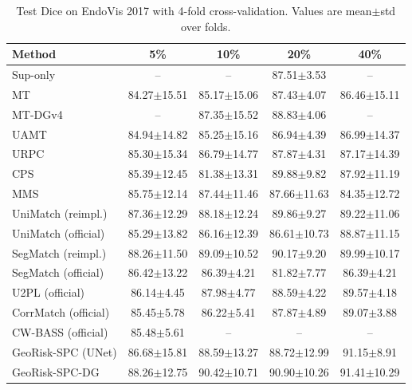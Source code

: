 \documentclass[journal]{IEEEtran}
\begin{document}
\begin{table}[t]
\caption{Test Dice on EndoVis 2017 with 4-fold cross-validation. Values are mean$\pm$std over folds.}
\label{tab:main_results}
\centering
\scriptsize
\begin{tabular}{lcccc}
\toprule
Method & 5\% & 10\% & 20\% & 40\% \\
\midrule
Sup-only & -- & -- & 87.51{\tiny$\pm$3.53} & -- \\
MT \cite{tarvainen2017mean} & 84.27{\tiny$\pm$15.51} & 85.17{\tiny$\pm$15.06} & 87.43{\tiny$\pm$4.07} & 86.46{\tiny$\pm$15.11} \\
MT-DGv4 & -- & 87.35{\tiny$\pm$15.52} & 88.83{\tiny$\pm$4.06} & -- \\
UAMT \cite{yu2019uncertainty} & 84.94{\tiny$\pm$14.82} & 85.25{\tiny$\pm$15.16} & 86.94{\tiny$\pm$4.39} & 86.99{\tiny$\pm$14.37} \\
URPC \cite{chen2021urpc} & 85.30{\tiny$\pm$15.34} & 86.79{\tiny$\pm$14.77} & 87.87{\tiny$\pm$4.31} & 87.17{\tiny$\pm$14.39} \\
CPS \cite{chen2021cps} & 85.39{\tiny$\pm$12.45} & 81.38{\tiny$\pm$13.31} & 89.88{\tiny$\pm$9.82} & 87.92{\tiny$\pm$11.19} \\
MMS \cite{li2023minmax} & 85.75{\tiny$\pm$12.14} & 87.44{\tiny$\pm$11.46} & 87.66{\tiny$\pm$11.63} & 84.35{\tiny$\pm$12.72} \\
UniMatch (reimpl.) \cite{yang2023unimatch} & 87.36{\tiny$\pm$12.29} & 88.18{\tiny$\pm$12.24} & 89.86{\tiny$\pm$9.27} & 89.22{\tiny$\pm$11.06} \\
UniMatch (official) \cite{yang2023unimatch} & 85.29{\tiny$\pm$13.82} & 86.16{\tiny$\pm$12.39} & 86.61{\tiny$\pm$10.73} & 88.87{\tiny$\pm$11.15} \\
SegMatch (reimpl.) \cite{segmatch2025} & 88.26{\tiny$\pm$11.50} & 89.09{\tiny$\pm$10.52} & 90.17{\tiny$\pm$9.20} & 89.99{\tiny$\pm$10.17} \\
SegMatch (official) \cite{segmatch2025} & 86.42{\tiny$\pm$13.22} & 86.39{\tiny$\pm$4.21} & 81.82{\tiny$\pm$7.77} & 86.39{\tiny$\pm$4.21} \\
U2PL (official) \cite{wang2022u2pl} & 86.14{\tiny$\pm$4.45} & 87.98{\tiny$\pm$4.77} & 88.59{\tiny$\pm$4.22} & 89.57{\tiny$\pm$4.18} \\
CorrMatch (official) \cite{sun2024corrmatch} & 85.45{\tiny$\pm$5.78} & 86.22{\tiny$\pm$5.41} & 87.87{\tiny$\pm$4.89} & 89.07{\tiny$\pm$3.88} \\
CW-BASS (official) \cite{cwbass2025} & 85.48{\tiny$\pm$5.61} & -- & -- & -- \\
\midrule
GeoRisk-SPC (UNet) & 86.68{\tiny$\pm$15.81} & 88.59{\tiny$\pm$13.27} & 88.72{\tiny$\pm$12.99} & 91.15{\tiny$\pm$8.91} \\
GeoRisk-SPC-DG & 88.26{\tiny$\pm$12.75} & 90.42{\tiny$\pm$10.71} & 90.90{\tiny$\pm$10.26} & 91.41{\tiny$\pm$10.29} \\
\bottomrule
\end{tabular}
\end{table}
\end{document}
